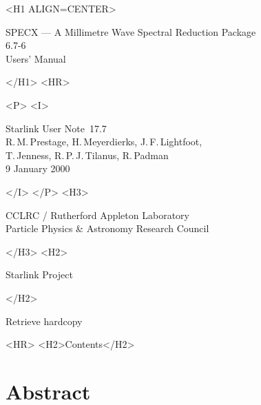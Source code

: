 \documentclass[twoside,11pt]{article}
\newcommand{\stardoccategory}  {Starlink User Note}
\newcommand{\stardocsource}    {sun\stardocnumber}
\newcommand{\stardocnumber}    {17.7}
\newcommand{\stardocauthors}   {R.\,M.\,Prestage, H.\,Meyerdierks,
J.\,F.\,Lightfoot, \\ T.\,Jenness, R.\,P.\,J.\,Tilanus, R.\,Padman}
\newcommand{\stardocdate}      {9 January 2000}
\newcommand{\stardoctitle}     {SPECX --- A Millimetre Wave Spectral Reduction 
Package}
\newcommand{\stardocversion}   {6.7-6}
\newcommand{\stardocmanual}    {Users' Manual}
\newcommand{\htmladdnormallink}[2]{#1}
\newcommand{\htmladdimg}[1]{}
\newcommand{\htmlref}[2]{#1}
\newcommand{\htmladdtonavigation}[1]{}
\newcommand{\xlabel}[1]{}
\renewcommand{\_}{\texttt{\symbol{95}}}
\begin{document}
\begin{htmlonly}
   \xlabel{}
   \begin{rawhtml} <H1 ALIGN=CENTER> \end{rawhtml}
      \stardoctitle\\
      \stardocversion\\
      \stardocmanual
   \begin{rawhtml} </H1> <HR> \end{rawhtml}


   \begin{rawhtml} <P> <I> \end{rawhtml}
   \stardoccategory\ \stardocnumber \\
   \stardocauthors \\
   \stardocdate
   \begin{rawhtml} </I> </P> <H3> \end{rawhtml}
      \htmladdnormallink{CCLRC}{http://www.cclrc.ac.uk} /
      \htmladdnormallink{Rutherford Appleton Laboratory}
                        {http://www.cclrc.ac.uk/ral} \\
      \htmladdnormallink{Particle Physics \& Astronomy Research Council}
                        {http://www.pparc.ac.uk} \\
   \begin{rawhtml} </H3> <H2> \end{rawhtml}
      \htmladdnormallink{Starlink Project}{http://www.starlink.rl.ac.uk/}
   \begin{rawhtml} </H2> \end{rawhtml}
   \htmladdnormallink{\htmladdimg{source.gif} Retrieve hardcopy}
      {http://www.starlink.rl.ac.uk/cgi-bin/hcserver?\stardocsource}\\

  \label{stardoccontents}
  \begin{rawhtml} 
    <HR>
    <H2>Contents</H2>
  \end{rawhtml}
  \htmladdtonavigation{\htmlref{\htmladdimg{contents_motif.gif}}
        {stardoccontents}}

  \section{\xlabel{abstract}Abstract}
\end{htmlonly}
\end{document}
